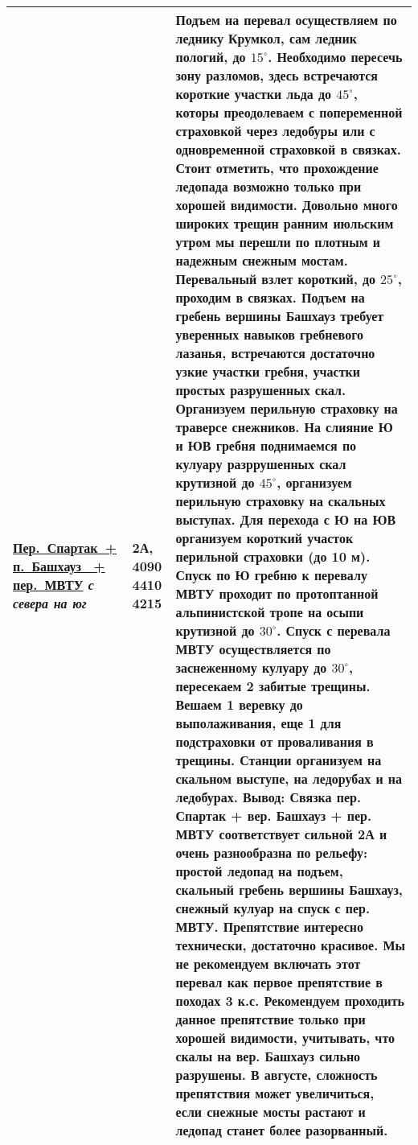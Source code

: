 {\begin{longtable}{|>{\centering\arraybackslash}m{3.8cm}|>{\centering\arraybackslash}m{1.3cm}|>{\raggedright\arraybackslash}m{12.5cm}|}
			\hyperref[subsec:Day6]{Пер.~Спартак~+ п.~Башхауз~ + пер.~МВТУ}											\newline\textit{с севера на юг}			&	2А, 4090 4410 4215			&	Подъем на перевал осуществляем по леднику Крумкол, сам ледник пологий, до $15^\circ$. Необходимо пересечь зону разломов, здесь встречаются короткие участки льда до $45^\circ$, которы преодолеваем с попеременной страховкой через ледобуры или с одновременной страховкой в связках. Стоит отметить, что прохождение ледопада возможно только при хорошей видимости. Довольно много широких трещин ранним июльским утром мы перешли по плотным и надежным снежным мостам. Перевальный взлет короткий, до $25^\circ$, проходим в связках. Подъем на гребень вершины Башхауз требует уверенных навыков гребневого лазанья, встречаются достаточно узкие участки гребня, участки простых разрушенных скал. Организуем перильную страховку на траверсе снежников. На слияние Ю и ЮВ гребня поднимаемся по кулуару разррушенных скал крутизной до $45^\circ$, организуем перильную страховку на скальных выступах. Для перехода с Ю на ЮВ организуем короткий участок перильной страховки (до 10 м). Спуск по Ю гребню к перевалу МВТУ проходит по протоптанной альпинистской тропе на осыпи крутизной до $30^\circ$. Спуск с перевала МВТУ осуществляется по заснеженному кулуару до $30^\circ$, пересекаем 2 забитые трещины. Вешаем 1 веревку до выполаживания, еще 1 для подстраховки от проваливания в трещины. Станции организуем на скальном выступе, на ледорубах и на ледобурах. \newline \textbf{Вывод:} Связка пер. Спартак + вер. Башхауз + пер. МВТУ соответствует сильной 2А и очень разнообразна по рельефу: простой ледопад на подъем, скальный гребень вершины Башхауз, снежный кулуар на спуск с пер. МВТУ. Препятствие интересно технически, достаточно красивое. Мы не рекомендуем включать этот перевал как первое препятствие в походах 3 к.с. Рекомендуем проходить данное препятствие только при хорошей видимости, учитывать, что скалы на вер. Башхауз сильно разрушены. В августе, сложность препятствия может увеличиться, если снежные мосты растают и ледопад станет более разорванный.																											\\ \hline

\end{longtable}}
